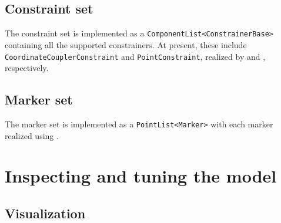 \subsection{Constraint set}

The constraint set is implemented as a {\tt ComponentList<ConstrainerBase>}
containing all the supported constrainers. At present, these include {\tt
CoordinateCouplerConstraint} and {\tt PointConstraint}, realized by
 and
, respectively.

\subsection{Marker set}

The marker set is implemented as a {\tt PointList<Marker>} with each marker
realized using .

\section{Inspecting and tuning the model}
\label{inspectingAndTuning:sec}

\subsection{Visualization}

